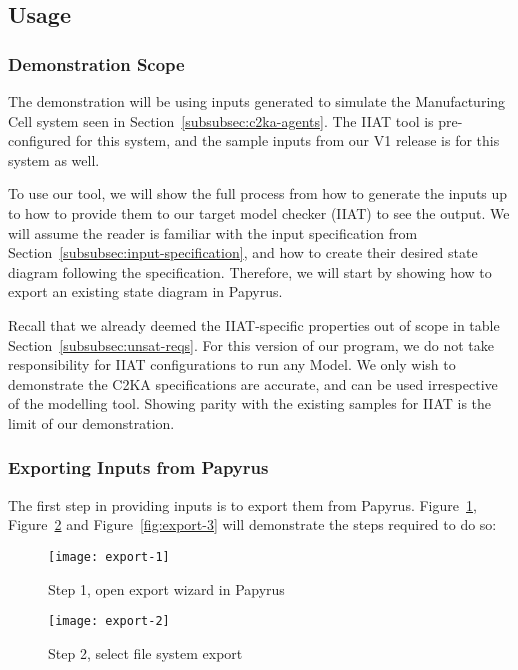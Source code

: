 \subsection{Usage}\label{subsec:usage}
\subsubsection{Demonstration Scope}\label{subsubsec:scope}
The demonstration will be using inputs generated to simulate the Manufacturing Cell system seen in Section~\ref{subsubsec:c2ka-agents}.
The IIAT tool is pre-configured for this system, and the sample inputs from our V1 release is for this system as well.

To use our tool, we will show the full process from how to generate the inputs up to how to provide them to our target model checker (IIAT) to see the output.
We will assume the reader is familiar with the input specification from Section~\ref{subsubsec:input-specification},
and how to create their desired state diagram following the specification.
Therefore, we will start by showing how to export an existing state diagram in Papyrus.

Recall that we already deemed the IIAT-specific properties out of scope in table Section~\ref{subsubsec:unsat-reqs}.
For this version of our program, we do not take responsibility for IIAT configurations to run any Model.
We only wish to demonstrate the C2KA specifications are accurate, and can be used irrespective of the modelling tool.
Showing parity with the existing samples for IIAT is the limit of our demonstration.


\subsubsection{Exporting Inputs from Papyrus}
The first step in providing inputs is to export them from Papyrus.
Figure~\ref{fig:export-1}, Figure~\ref{fig:export-2} and Figure~\ref{fig:export-3} will demonstrate the steps required to do so:
\begin{figure}[ht]
    \centering
    \texttt{[image: export-1]}
    \caption{Step 1, open export wizard in Papyrus}
    \label{fig:export-1}
\end{figure}

\begin{figure}[ht]
    \centering
    \texttt{[image: export-2]}
    \caption{Step 2, select file system export}
    \label{fig:export-2}
\end{figure}

